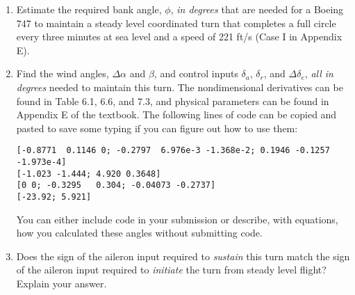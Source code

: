 \begin{question}
\begin{enumerate} \-\
    \item Estimate the required bank angle, $\phi$, \emph{in degrees} that are needed for a Boeing 747 to maintain a steady level coordinated turn that completes a full circle every three minutes at sea level and a speed of 221 ft/s (Case I in Appendix E).

    \item Find the wind angles, $\Delta \alpha$ and $\beta$, and control inputs $\delta_a$, $\delta_r$, and $\Delta \delta_e$, \emph{all in degrees} needed to maintain this turn. The nondimensional derivatives can be found in Table 6.1, 6.6, and 7.3, and physical parameters can be found in Appendix E of the textbook. The following lines of code can be copied and pasted to save some typing if you can figure out how to use them:

\begin{verbatim}
[-0.8771  0.1146 0; -0.2797  6.976e-3 -1.368e-2; 0.1946 -0.1257 -1.973e-4]
[-1.023 -1.444; 4.920 0.3648]
[0 0; -0.3295   0.304; -0.04073 -0.2737]
[-23.92; 5.921]
\end{verbatim}
    
    You can either include code in your submission or describe, with equations, how you calculated these angles without submitting code.

    \item Does the sign of the aileron input required to \emph{sustain} this turn match the sign of the aileron input required to \emph{initiate} the turn from steady level flight? Explain your answer.
\end{enumerate}

\end{question}
